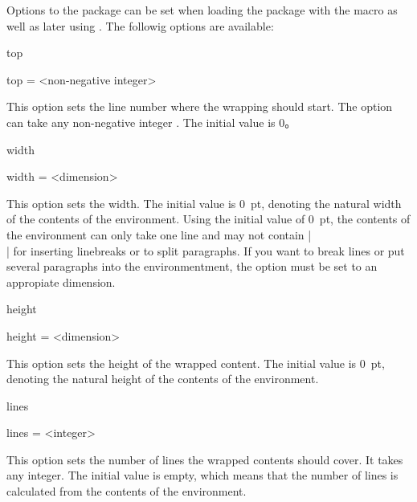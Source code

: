 \documentclass{ctxdoc}
\begin{document}
\begin{documentation}
 \begin{function}{\wrapstuffset}
   \begin{syntax}
      
   \end{syntax}
   Options to the  package can be set when loading the package with the  macro as well as later using .
   The followig options are available:
 \end{function}

 \begin{function}{top}
   \begin{syntax}
     top = <non-negative integer>
   \end{syntax}
   This option sets the line number where the wrapping should start. The option can take any non-negative integer .
   The initial value is \num{0}。
 \end{function}

 \begin{function}{width}
   \begin{syntax}
     width = <dimension>
   \end{syntax}
   This option sets the width. The initial value is \qty{0}{pt}, denoting the natural width of the contents of the  environment.
   Using the initial value of \qty{0}{pt}, the contents of the  environment can only take one line and may not contain |\\| for inserting linebreaks or  to split paragraphs.
   If you want to break lines or put several paragraphs into the  environmentment, the option  must be set to an appropiate dimension.
 \end{function}

 \begin{function}{height}
   \begin{syntax}
     height = <dimension>
   \end{syntax}
   This option sets the height of the wrapped content. The initial value is \qty{0}{pt}, denoting the natural height of the contents of the  environment.
 \end{function}

 \begin{function}{lines}
   \begin{syntax}
     lines = <integer>
   \end{syntax}
   This option sets the number of lines the wrapped contents should cover. It takes any integer.
   The initial value is empty, which means that the number of lines is calculated from the contents of the  environment.
 \end{function}


\end{documentation}
\end{document}
